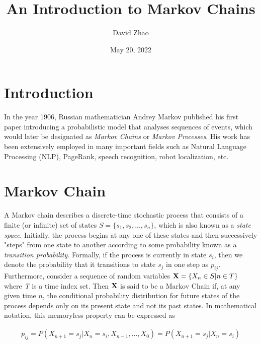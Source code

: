 \documentclass[a4paper,12pt]{article}
\theoremstyle{definition}
\let\oldtextbf\mathbf
\renewcommand{\mathbf}[1]{\oldtextbf{\boldmath #1}}
\begin{document}
\title{An Introduction to Markov Chains}
\author{David Zhao}
\date{May 20, 2022}
\maketitle
{}

\section*{Introduction}

In the year 1906, Russian mathematician Andrey Markov published his first paper
introducing a probabilistic model that analyses sequences of events, 
which would later be designated as \emph{Markov Chains} or \emph{Markov Processes}. His work has been extensively employed
in many important fields such as Natural Language Processing (NLP), PageRank, speech recognition, robot localization, etc.

\section*{Markov Chain}

	A Markov chain describes a discrete-time stochastic process that consists of a finite (or infinite) set of states 
	$S = \{s_1, s_2, ..., s_n \}$, which is also known as a \emph{state space}. Initially, the process begins at any 
	one of these states and then successively "steps" from one state to another according to some probability known as 
	a \emph{transition probability}. Formally, if the process is currently in state $s_i$, then we denote the probability 
	that it transitions to state $s_j$ in one step as $p_{ij}$.
	\newline
	Furthermore, consider a sequence of random variables $\mathbf{X} = \{X_n \in S | n \in T\}$ where \emph{T} is a time index 
	set. Then $\mathbf{X}$ is said to be a Markov Chain if, at any given time $n$, the conditional probability distribution for future states
	of the process depends only on its present state and not its past states. In mathematical notation, this memoryless
	property can be expressed as

	\begin{equation*}
		\begin{aligned}
			p_{ij} = P(X_{n+1} = s_j | X_{n} = s_i, X_{n-1}, ... , X_0) = P(X_{n+1} = s_j | X_{n}= s_i)
		\end{aligned}
	\end{equation*}
\end{document}
